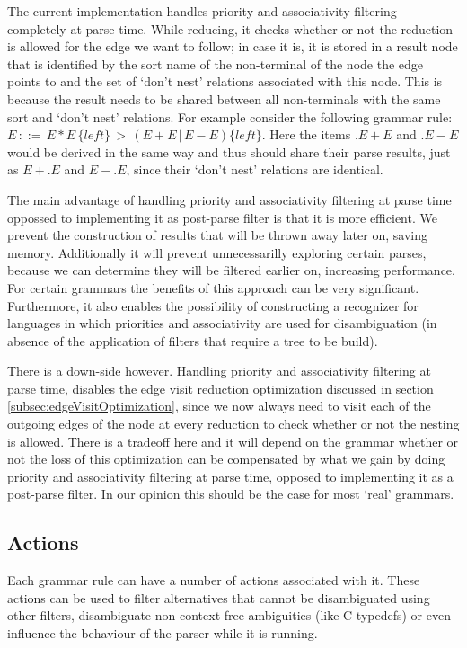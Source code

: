 \documentclass[a4paper,10pt]{article}
\begin{document}
The current implementation handles priority and associativity filtering completely at parse time. While reducing, it checks whether or not the reduction is allowed for the edge we want to follow; in case it is, it is stored in a result node that is identified by the sort name of the non-terminal of the node the edge points to and the set of `don't nest' relations associated with this node. This is because the result needs to be shared between all non-terminals with the same sort and `don't nest' relations. For example consider the following grammar rule: $E\,::=\,E * E\,\{left\}\,>\,(E + E\,|\,E - E)\{left\}$. Here the items $.E + E$ and $.E - E$ would be derived in the same way and thus should share their parse results, just as $E+.E$ and $E-.E$, since their `don't nest' relations are identical.

The main advantage of handling priority and associativity filtering at parse time oppossed to implementing it as post-parse filter is that it is more efficient. We prevent the construction of results that will be thrown away later on, saving memory. Additionally it will prevent unnecessarilly exploring certain parses, because we can determine they will be filtered earlier on, increasing performance. For certain grammars the benefits of this approach can be very significant. Furthermore, it also enables the possibility of constructing a recognizer for languages in which priorities and associativity are used for disambiguation (in absence of the application of filters that require a tree to be build).

There is a down-side however. Handling priority and associativity filtering at parse time, disables the edge visit reduction optimization discussed in section \ref{subsec:edgeVisitOptimization}, since we now always need to visit each of the outgoing edges of the node at every reduction to check whether or not the nesting is allowed. There is a tradeoff here and it will depend on the grammar whether or not the loss of this optimization can be compensated by what we gain by doing priority and associativity filtering at parse time, opposed to implementing it as a post-parse filter. In our opinion this should be the case for most `real' grammars.

\subsection{Actions}

Each grammar rule can have a number of actions associated with it. These actions can be used to filter alternatives that cannot be disambiguated using other filters, disambiguate non-context-free ambiguities (like C typedefs) or even influence the behaviour of the parser while it is running.
\end{document}
